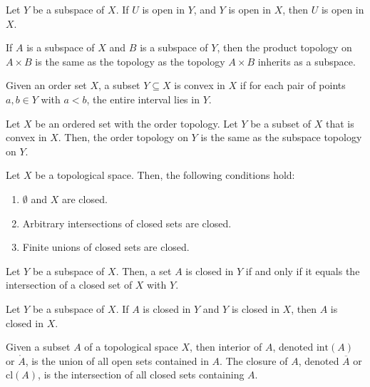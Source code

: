 \documentclass{article}
\begin{document}
\medskip{}

    Let $Y$ be a subspace of $X$. If $U$ is open in $Y$, and $Y$ is open in $X$, then $U$ is open in $X$.

\medskip{}

    If $A$ is a subspace of $X$ and $B$ is a subspace of $Y$, then the product topology on $A \times B$ is the same as the topology as the topology $A \times B$ inherits as a subspace.

\medskip{}

    Given an order set $X$, a subset $Y \subseteq X$ is convex in $X$ if for each pair of points $a,b \in Y$ with $a<b$, the entire interval lies in $Y$.

\medskip{}

    Let $X$ be an ordered set with the order topology.
    Let $Y$ be a subset of $X$ that is convex in $X$.
    Then, the order topology on $Y$ is the same as the subspace topology on $Y$.

\medskip{}

    Let $X$ be a topological space. Then, the following conditions hold:
    \begin{enumerate}
        \item $\emptyset$ and $X$ are closed.
        \item Arbitrary intersections of closed sets are closed.
        \item Finite unions of closed sets are closed.
    \end{enumerate}

\medskip{}

    Let $Y$ be a subspace of $X$. Then, a set $A$ is closed in $Y$ if and only if it equals the intersection of a closed set of $X$ with $Y$.

\medskip{}

    Let $Y$ be a subspace of $X$. If $A$ is closed in $Y$ and $Y$ is closed in $X$, then $A$ is closed in $X$.

\medskip{}

    Given a subset $A$ of a topological space $X$, then interior of $A$, denoted $\text{int}(A)$ or $\mathring A$, is the union of all open sets contained in $A$.
    The closure of $A$, denoted $\overline A$ or $\text{cl}(A)$, is the intersection of all closed sets containing $A$.

\medskip{}
\end{document}
